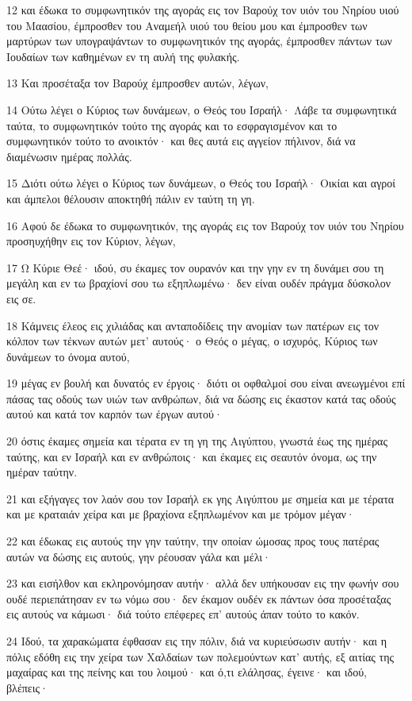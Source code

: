 \par 12 και έδωκα το συμφωνητικόν της αγοράς εις τον Βαρούχ τον υιόν του Νηρίου υιού του Μαασίου, έμπροσθεν του Αναμεήλ υιού του θείου μου και έμπροσθεν των μαρτύρων των υπογραψάντων το συμφωνητικόν της αγοράς, έμπροσθεν πάντων των Ιουδαίων των καθημένων εν τη αυλή της φυλακής.
\par 13 Και προσέταξα τον Βαρούχ έμπροσθεν αυτών, λέγων,
\par 14 Ούτω λέγει ο Κύριος των δυνάμεων, ο Θεός του Ισραήλ· Λάβε τα συμφωνητικά ταύτα, το συμφωνητικόν τούτο της αγοράς και το εσφραγισμένον και το συμφωνητικόν τούτο το ανοικτόν· και θες αυτά εις αγγείον πήλινον, διά να διαμένωσιν ημέρας πολλάς.
\par 15 Διότι ούτω λέγει ο Κύριος των δυνάμεων, ο Θεός του Ισραήλ· Οικίαι και αγροί και άμπελοι θέλουσιν αποκτηθή πάλιν εν ταύτη τη γη.
\par 16 Αφού δε έδωκα το συμφωνητικόν, της αγοράς εις τον Βαρούχ τον υιόν του Νηρίου προσηυχήθην εις τον Κύριον, λέγων,
\par 17 Ω Κύριε Θεέ· ιδού, συ έκαμες τον ουρανόν και την γην εν τη δυνάμει σου τη μεγάλη και εν τω βραχίονί σου τω εξηπλωμένω· δεν είναι ουδέν πράγμα δύσκολον εις σε.
\par 18 Κάμνεις έλεος εις χιλιάδας και ανταποδίδεις την ανομίαν των πατέρων εις τον κόλπον των τέκνων αυτών μετ' αυτούς· ο Θεός ο μέγας, ο ισχυρός, Κύριος των δυνάμεων το όνομα αυτού,
\par 19 μέγας εν βουλή και δυνατός εν έργοις· διότι οι οφθαλμοί σου είναι ανεωγμένοι επί πάσας τας οδούς των υιών των ανθρώπων, διά να δώσης εις έκαστον κατά τας οδούς αυτού και κατά τον καρπόν των έργων αυτού·
\par 20 όστις έκαμες σημεία και τέρατα εν τη γη της Αιγύπτου, γνωστά έως της ημέρας ταύτης, και εν Ισραήλ και εν ανθρώποις· και έκαμες εις σεαυτόν όνομα, ως την ημέραν ταύτην.
\par 21 και εξήγαγες τον λαόν σου τον Ισραήλ εκ γης Αιγύπτου με σημεία και με τέρατα και με κραταιάν χείρα και με βραχίονα εξηπλωμένον και με τρόμον μέγαν·
\par 22 και έδωκας εις αυτούς την γην ταύτην, την οποίαν ώμοσας προς τους πατέρας αυτών να δώσης εις αυτούς, γην ρέουσαν γάλα και μέλι·
\par 23 και εισήλθον και εκληρονόμησαν αυτήν· αλλά δεν υπήκουσαν εις την φωνήν σου ουδέ περιεπάτησαν εν τω νόμω σου· δεν έκαμον ουδέν εκ πάντων όσα προσέταξας εις αυτούς να κάμωσι· διά τούτο επέφερες επ' αυτούς άπαν τούτο το κακόν.
\par 24 Ιδού, τα χαρακώματα έφθασαν εις την πόλιν, διά να κυριεύσωσιν αυτήν· και η πόλις εδόθη εις την χείρα των Χαλδαίων των πολεμούντων κατ' αυτής, εξ αιτίας της μαχαίρας και της πείνης και του λοιμού· και ό,τι ελάλησας, έγεινε· και ιδού, βλέπεις·
